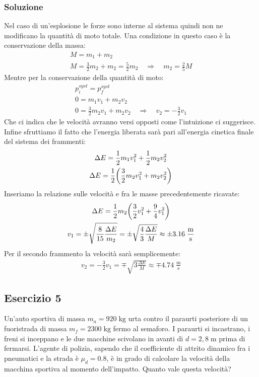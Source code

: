 \documentclass[12pt,a4paper]{book}
\begin{document}
\subsubsection*{Soluzione}
Nel caso di un'esplosione le forze sono interne al sistema quindi non ne modificano la quantità di moto totale. Una condizione in questo caso è la conservazione della massa:
%
\begin{gather*}
M=m_1+m_2 \\
M=\frac{3}{2}m_2+m_2=\frac{5}{2}m_2 \quad \Longrightarrow \quad m_2=\frac{2}{5}M
\end{gather*}
%
Mentre per la conservazione della quantità di moto:
%
\begin{gather*}
p_i^{syst}=p_f^{syst} \\
0=m_1v_1+m_2v_2 \\
0=\frac{3}{2}m_2v_1+m_2v_2 \quad \Longrightarrow \quad v_2=-\frac{3}{2}v_1
\end{gather*}
%
Che ci indica che le velocità avranno versi opposti come l'intuizione ci suggerisce. Infine sfruttiamo il fatto che l'energia liberata sarà pari all'energia cinetica finale del sistema dei frammenti:
%
\begin{gather*}
\Delta E = \frac{1}{2}m_1v_1^2+\frac{1}{2}m_2v_2^2\\
\Delta E = \frac{1}{2}\qty(\frac{3}{2}m_2v_1^2+m_2v_2^2)
\end{gather*}
%
Inseriamo la relazione sulle velocità e fra le masse precedentemente ricavate:
%
\begin{gather*}
\Delta E = \frac{1}{2}m_2\qty(\frac{3}{2}v_1^2+\frac{9}{4}v_1^2) \\
v_1=\pm\sqrt{\frac{8}{15}\frac{\Delta E}{m_2}}=\pm \sqrt{\frac{4}{3}\frac{\Delta E}{M}}\approx \pm 3.16 \; \frac{\text{m}}{\text{s}}
\end{gather*}
%
Per il secondo frammento la velocità sarà semplicemente:
%
\begin{gather*}
v_2=-\frac{3}{2}v_1= \mp \sqrt{3\frac{\Delta E}{M}}\approx \mp 4.74  \; \frac{\text{m}}{\text{s}}
\end{gather*}
%

\subsection*{Esercizio 5}
Un'auto sportiva di massa $m_a=920 \; \text{kg}$ urta contro il paraurti posteriore di un fuoristrada di massa $m_f=2300 \; \text{kg}$ fermo al semaforo. I paraurti si incastrano, i freni si inceppano e le due macchine scivolano in avanti di $d=2,8 \; \text{m}$ prima di fermarsi. L'agente di polizia, sapendo che il coefficiente di attrito dinamico fra i pneumatici e la strada è $\mu_d = 0.8$, è in grado di calcolare la velocità della macchina sportiva al momento dell'impatto. Quanto vale questa velocità? 
\end{document}
